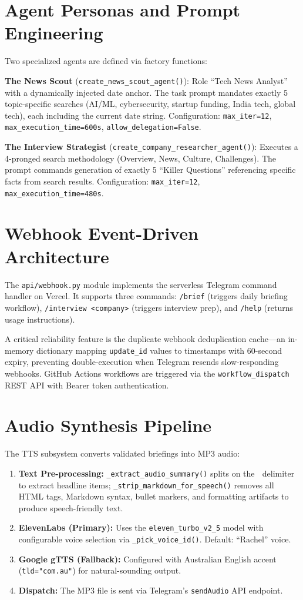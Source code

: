 \documentclass[12pt,a4paper]{report}
\begin{document}
\section{Agent Personas and Prompt Engineering}
Two specialized agents are defined via factory functions:

\textbf{The News Scout} (\texttt{create\_news\_scout\_agent()}): Role ``Tech News Analyst'' with a dynamically injected date anchor. The task prompt mandates exactly 5 topic-specific searches (AI/ML, cybersecurity, startup funding, India tech, global tech), each including the current date string. Configuration: \texttt{max\_iter=12}, \texttt{max\_execution\_time=600s}, \texttt{allow\_delegation=False}.

\textbf{The Interview Strategist} (\texttt{create\_company\_researcher\_agent()}): Executes a 4-pronged search methodology (Overview, News, Culture, Challenges). The prompt commands generation of exactly 5 ``Killer Questions'' referencing specific facts from search results. Configuration: \texttt{max\_iter=12}, \texttt{max\_execution\_time=480s}.

\section{Webhook Event-Driven Architecture}
The \texttt{api/webhook.py} module implements the serverless Telegram command handler on Vercel. It supports three commands: \texttt{/brief} (triggers daily briefing workflow), \texttt{/interview <company>} (triggers interview prep), and \texttt{/help} (returns usage instructions).

A critical reliability feature is the duplicate webhook deduplication cache---an in-memory dictionary mapping \texttt{update\_id} values to timestamps with 60-second expiry, preventing double-execution when Telegram resends slow-responding webhooks. GitHub Actions workflows are triggered via the \texttt{workflow\_dispatch} REST API with Bearer token authentication.

\section{Audio Synthesis Pipeline}
The TTS subsystem converts validated briefings into MP3 audio:
\begin{enumerate}
    \item \textbf{Text Pre-processing:} \texttt{\_extract\_audio\_summary()} splits on the 📰 delimiter to extract headline items; \texttt{\_strip\_markdown\_for\_speech()} removes all HTML tags, Markdown syntax, bullet markers, and formatting artifacts to produce speech-friendly text.
    \item \textbf{ElevenLabs (Primary):} Uses the \texttt{eleven\_turbo\_v2\_5} model with configurable voice selection via \texttt{\_pick\_voice\_id()}. Default: ``Rachel'' voice.
    \item \textbf{Google gTTS (Fallback):} Configured with Australian English accent (\texttt{tld="com.au"}) for natural-sounding output.
    \item \textbf{Dispatch:} The MP3 file is sent via Telegram's \texttt{sendAudio} API endpoint.
\end{enumerate}
\end{document}
